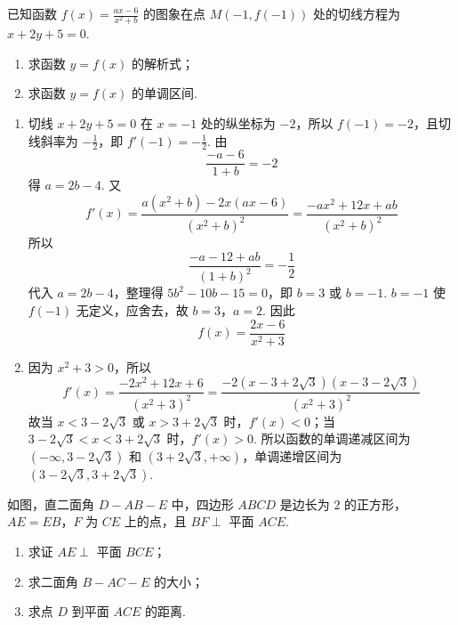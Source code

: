 \begin{problem}
已知函数 \(f(x) = \frac{ax - 6}{x^2 + b}\) 的图象在点 \(M(-1, f(-1))\) 处的切线方程为 \(x + 2y + 5 = 0\).

\begin{enumerate}
\item 求函数 \(y = f(x)\) 的解析式；
\item 求函数 \(y = f(x)\) 的单调区间.
\end{enumerate}
\end{problem}


\begin{solution}
\begin{enumerate}
\item 切线 \(x+2y+5=0\) 在 \(x=-1\) 处的纵坐标为 \(-2\)，所以 \(f(-1)=-2\)，且切线斜率为 \(-\frac{1}{2}\)，即 \(f'(-1)=-\frac{1}{2}\). 由
\[
\frac{-a-6}{1+b}=-2
\]
得 \(a=2b-4\). 又
\[
f'(x)=\frac{a(x^2+b)-2x(ax-6)}{(x^2+b)^2}
=\frac{-ax^2+12x+ab}{(x^2+b)^2}
\]
所以
\[
\frac{-a-12+ab}{(1+b)^2}=-\frac{1}{2}
\]
代入 \(a=2b-4\)，整理得 \(5b^2-10b-15=0\)，即 \(b=3\) 或 \(b=-1\). \(b=-1\) 使 \(f(-1)\) 无定义，应舍去，故 \(b=3\)，\(a=2\). 因此
\[
f(x)=\frac{2x-6}{x^2+3}
\]
\item 因为 \(x^2+3>0\)，所以
\[
f'(x)=\frac{-2x^2+12x+6}{(x^2+3)^2}
=\frac{-2\left(x-3+2\sqrt{3}\right)\left(x-3-2\sqrt{3}\right)}{(x^2+3)^2}
\]
故当 \(x<3-2\sqrt{3}\) 或 \(x>3+2\sqrt{3}\) 时，\(f'(x)<0\)；当 \(3-2\sqrt{3}<x<3+2\sqrt{3}\) 时，\(f'(x)>0\). 所以函数的单调递减区间为 \(\left(-\infty,3-2\sqrt{3}\right)\) 和 \(\left(3+2\sqrt{3},+\infty\right)\)，单调递增区间为 \(\left(3-2\sqrt{3},3+2\sqrt{3}\right)\).
\end{enumerate}
\end{solution}




\begin{problem}
如图，直二面角 \(D - AB - E\) 中，四边形 \(ABCD\) 是边长为 \(2\) 的正方形，\(AE = EB\)，\(F\) 为 \(CE\) 上的点，且 \(BF \perp\) 平面 \(ACE\).

\begin{enumerate}
\item 求证 \(AE \perp\) 平面 \(BCE\)；
\item 求二面角 \(B - AC - E\) 的大小；
\item 求点 \(D\) 到平面 \(ACE\) 的距离.
\end{enumerate}

\end{problem}


